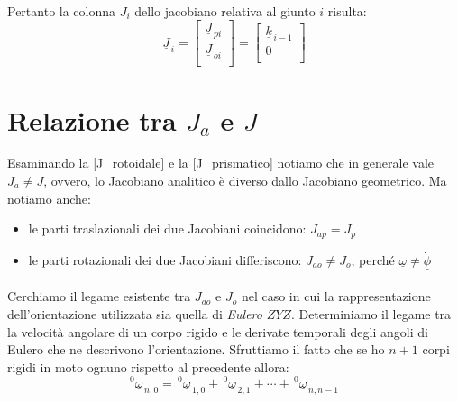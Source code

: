 \paragraph{}
Pertanto la colonna $J_i$ dello jacobiano relativa al giunto $i$ risulta:
\begin{equation} \label{J_prismatico}
	\underline{J}_{\,i} = 
	\begin{bmatrix}
		\underline{J}_{\,pi} \\
		\underline{J}_{\,oi} \\
	\end{bmatrix}
	= 
	\begin{bmatrix}
		\underline{k}_{\,i-1} \\
		0 \\
	\end{bmatrix}
\end{equation}

\section{Relazione tra $J_a$ e $J$}
Esaminando la \eqref{J_rotoidale} e la \eqref{J_prismatico} notiamo che in generale vale $J_a \neq J$, ovvero, lo Jacobiano analitico è diverso dallo Jacobiano geometrico. Ma notiamo anche:
\begin{itemize}
	\item le parti traslazionali dei due Jacobiani coincidono: $J_{ap} = J_p$
	\item le parti rotazionali dei due Jacobiani differiscono: $J_{ao} \neq J_o$, perché $\underline{\omega} \neq \underline{\dot{\phi}}$
\end{itemize}

\paragraph{}
Cerchiamo il legame esistente tra $J_{ao}$ e $J_o$ nel caso in cui la rappresentazione dell'orientazione utilizzata sia quella di \emph{Eulero} $ZYZ$. Determiniamo il legame tra la velocità angolare di un corpo rigido e le derivate temporali degli angoli di Eulero che ne descrivono l'orientazione. Sfruttiamo il fatto che se ho $n+1$ corpi rigidi in moto ognuno rispetto al precedente allora:
\begin{equation} \label{omega}
	^0\underline{\omega}_{\,n,0} = \,^0\underline{\omega}_{\,1,0} + \,^0\underline{\omega}_{\,2,1} + \cdots + \,^0\underline{\omega}_{\,n,n-1}
\end{equation}

